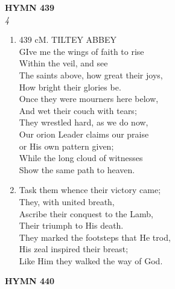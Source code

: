 \documentclass[11pt,a4paper]{article}
\begin{document}
\newpage
\begin{center}
    {\Large \textbf{HYMN 439}}
    \\
    \textit{4}
\end{center}
\vspace{1em}

\begin{enumerate}
    \item 439 cM. TILTEY ABBEY \\
        GIve me the wings of faith to rise \\
        Within the veil, and see \\
        The saints above, how great their joys, \\
        How bright their glories be. \\
        Once they were mourners here below, \\
        And wet their couch with tears; \\
        They wrestled hard, as we do now, \\
        Our orion Leader claims our praise \\
        or His own pattern given; \\
        While the long cloud of witnesses \\
        Show the same path to heaven.

    \item Task them whence their victory came; \\
        They, with united breath, \\
        Ascribe their conquest to the Lamb, \\
        Their triumph to His death. \\
        They marked the footsteps that He trod, \\
        His zeal inspired their breast; \\
        Like Him they walked the way of God.

\end{enumerate}

\newpage
\begin{center}
    {\Large \textbf{HYMN 440}}
\end{center}
\vspace{1em}
\end{document}
